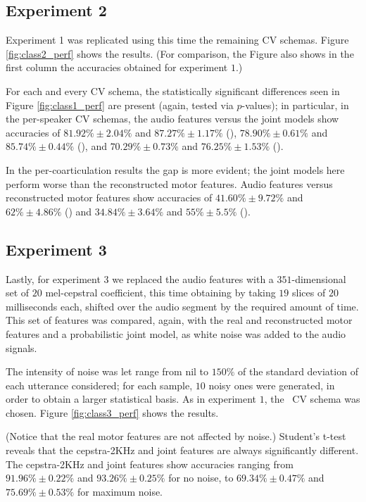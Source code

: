 \subsection{Experiment 2}
\label{subsec:exp2}

Experiment 1 was replicated using this time the remaining CV schemas.
Figure \ref{fig:class2_perf} shows the results. (For comparison,
the Figure also shows in the first column the accuracies obtained for
experiment $1$.)

For each and every CV schema, the statistically significant differences seen in
Figure \ref{fig:class1_perf} are present (again, tested via $p$-values);
in particular, in the per-speaker CV schemas, the audio features versus
the joint models show accuracies of
$81.92\% \pm 2.04\%$ and $87.27\% \pm 1.17\%$ (\spka),
$78.90\% \pm 0.61\%$ and $85.74\% \pm 0.44\%$ (\spkb), and
$70.29\% \pm 0.73\%$ and $76.25\% \pm 1.53\%$ (\spkc).

In the per-coarticulation results the gap is more evident; the joint models
here perform worse than the reconstructed motor features. Audio features
versus reconstructed motor features show accuracies of
$41.60\% \pm 9.72\%$ and $62\% \pm 4.86\%$ (\coa) and
$34.84\% \pm 3.64\%$ and $55\% \pm 5.5\%$ (\cob).

\subsection{Experiment 3}
\label{subsec:exp3}

Lastly, for experiment 3 we replaced the audio features with
a $351$-dimensional set of $20$ mel-cepstral
coefficient, this time obtaining by taking $19$ slices of $20$ milliseconds each,
shifted over the audio segment by the required amount of time. This set of
features was compared, again, with the real and reconstructed motor features and
a probabilistic joint model, as white noise was added to the audio signals.

The intensity of noise was let range from nil to $150\%$ of the standard deviation
of each utterance considered; for each sample, $10$ noisy ones were generated, in
order to obtain a larger statistical basis. As in experiment $1$, the \overall\ CV
schema was chosen. Figure \ref{fig:class3_perf} shows the results.

(Notice that the real motor features are not affected by noise.) Student's t-test
reveals that the cepstra-2KHz and joint features are always significantly different.
The cepstra-2KHz and joint features show accuracies ranging from
$91.96\% \pm 0.22\%$ and $93.26\% \pm 0.25\%$ for no noise, to
$69.34\% \pm 0.47\%$ and $75.69\% \pm 0.53\%$ for maximum noise.
